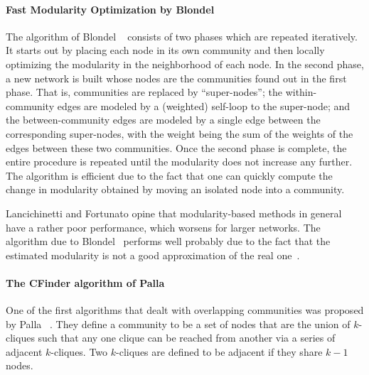 \paragraph{Fast Modularity Optimization by Blondel \etal} 
The algorithm of Blondel \etal~\cite{BGLL08} consists of two phases which are repeated iteratively. 
It starts out by placing each node in its own community and then locally optimizing the modularity 
in the neighborhood of each node. In the second phase, a new network is built whose nodes are the 
communities found out in the first phase. That is, communities are replaced by ``super-nodes''; the 
within-community edges are modeled by a (weighted) self-loop to the super-node; and the between-community 
edges are modeled by a single edge between the corresponding super-nodes, with the weight being 
the sum of the weights of the edges between these two communities. 
Once the second phase is complete, the entire procedure is repeated until the modularity does not 
increase any further. The algorithm is efficient due to the fact that one can quickly compute the 
change in modularity obtained by moving an isolated node into a community.

Lancichinetti and Fortunato opine that modularity-based methods in general have a rather poor 
performance, which worsens for larger networks. The algorithm due to Blondel \etal\ performs well 
probably due to the fact that the estimated modularity is not a good approximation of the real one~\cite{LF09}.  


\paragraph{The CFinder algorithm of Palla \etal} One of the first algorithms that dealt with overlapping 
communities was proposed by Palla \etal~\cite{PDFV05}. They define a community to be a set of nodes 
that are the union of $k$-cliques such that any one clique can be reached from another via a series of 
adjacent $k$-cliques. Two $k$-cliques are defined to be adjacent if they share $k - 1$ nodes. 

